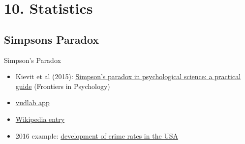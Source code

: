 \documentclass[xcolor=table,       handout,    xcolor=dvipsnames]{beamer}\usepackage[]{graphicx}\usepackage[]{color}
\begin{document}
\section{10. Statistics}

\subsection{Simpsons Paradox}

\begin{frame}{Simpson's Paradox}
\begin{itemize}
\item Kievit et al (2015): \href{http://journal.frontiersin.org/article/10.3389/fpsyg.2013.00513/full}{Simpson's paradox in psychological science: a practical guide} (Frontiers in Psychology)
\item \href{http://vudlab.com/simpsons/}{vudlab app}
\item \href{https://en.wikipedia.org/wiki/Simpson\%27s\_paradox\#Examples}{Wikipedia entry}
\item 2016 example: \href{http://www.nytimes.com/2016/09/28/us/murder-rate-cities.html}{development of crime rates in the USA}
\end{itemize}
\label{simpson}
\end{frame}

\end{document}
